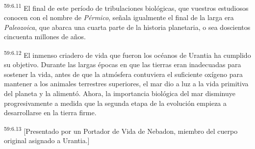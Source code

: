 \par
\textsuperscript{59:6.11} El final de este período de tribulaciones biológicas, que vuestros estudiosos conocen con el nombre de \textit{Pérmico}, señala igualmente el final de la larga era \textit{Paleozoica}, que abarca una cuarta parte de la historia planetaria, o sea doscientos cincuenta millones de años.

\par
\textsuperscript{59:6.12} El inmenso criadero de vida que fueron los océanos de Urantia ha cumplido su objetivo. Durante las largas épocas en que las tierras eran inadecuadas para sostener la vida, antes de que la atmósfera contuviera el suficiente oxígeno para mantener a los animales terrestres superiores, el mar dio a luz a la vida primitiva del planeta y la alimentó. Ahora, la importancia biológica del mar disminuye progresivamente a medida que la segunda etapa de la evolución empieza a desarrollarse en la tierra firme.

\par
\textsuperscript{59:6.13} [Presentado por un Portador de Vida de Nebadon, miembro del cuerpo original asignado a Urantia.]